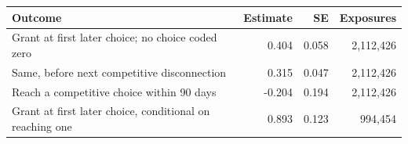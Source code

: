 \begin{tabular}{lrrr}
\toprule
Outcome & Estimate & SE & Exposures \\
\midrule
Grant at first later choice; no choice coded zero & 0.404 & 0.058 & 2,112,426 \\
Same, before next competitive disconnection & 0.315 & 0.047 & 2,112,426 \\
Reach a competitive choice within 90 days & -0.204 & 0.194 & 2,112,426 \\
Grant at first later choice, conditional on reaching one & 0.893 & 0.123 & 994,454 \\
\bottomrule
\end{tabular}
